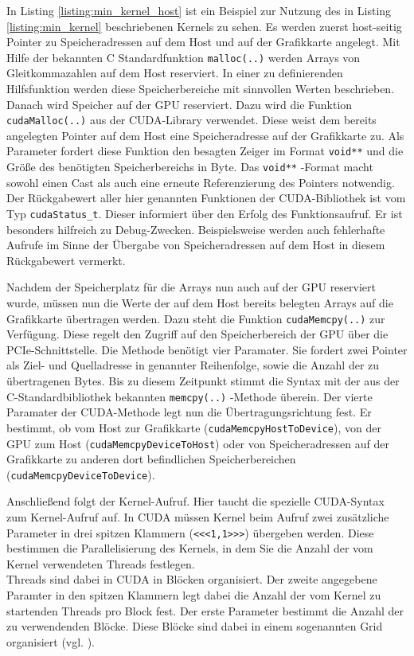 \documentclass[../main.tex]{subfiles}
\begin{document}
In Listing \ref{listing:min_kernel_host} ist ein Beispiel zur Nutzung des in Listing \ref{listing:min_kernel} beschriebenen Kernels zu sehen. Es werden zuerst host-seitig Pointer zu Speicheradressen auf dem Host und auf der Grafikkarte angelegt. Mit Hilfe der bekannten C Standardfunktion \texttt{malloc(..)} werden Arrays von Gleitkommazahlen auf dem Host reserviert. In einer zu definierenden Hilfsfunktion werden diese Speicherbereiche mit sinnvollen Werten beschrieben. Danach wird Speicher auf der GPU reserviert. Dazu wird die Funktion \texttt{cudaMalloc(..)} aus der CUDA-Library verwendet. Diese weist dem bereits angelegten Pointer auf dem Host eine Speicheradresse auf der Grafikkarte zu. Als Parameter fordert diese Funktion den besagten Zeiger im Format \texttt{void**} und die Größe des benötigten Speicherbereichs in Byte. Das \texttt{void**} -Format macht sowohl einen Cast als auch eine erneute Referenzierung des Pointers notwendig. \\ Der Rückgabewert aller hier genannten Funktionen der CUDA-Bibliothek ist vom Typ \texttt{cudaStatus\_t}. Dieser informiert über den Erfolg des Funktionsaufruf. Er ist besonders hilfreich zu Debug-Zwecken. Beispielsweise werden auch fehlerhafte Aufrufe im Sinne der Übergabe von Speicheradressen auf dem Host in diesem Rückgabewert vermerkt. \par Nachdem der Speicherplatz für die Arrays nun auch auf der GPU reserviert wurde, müssen nun die Werte der auf dem Host bereits belegten Arrays auf die Grafikkarte übertragen werden. Dazu steht die Funktion \texttt{cudaMemcpy(..)} zur Verfügung. Diese regelt den Zugriff auf den Speicherbereich der GPU über die PCIe-Schnittstelle. Die Methode benötigt vier Paramater. Sie fordert zwei Pointer als Ziel- und Quelladresse in genannter Reihenfolge, sowie die Anzahl der zu übertragenen Bytes. Bis zu diesem Zeitpunkt stimmt die Syntax mit der aus der C-Standardbibliothek bekannten \texttt{memcpy(..)} -Methode überein. Der vierte Paramater der CUDA-Methode legt nun die Übertragungsrichtung fest. Er bestimmt, ob vom Host zur Grafikkarte (\texttt{cudaMemcpyHostToDevice}), von der GPU zum Host (\texttt{cudaMemcpyDeviceToHost}) oder von Speicheradressen auf der Grafikkarte zu anderen dort befindlichen Speicherbereichen (\texttt{cudaMemcpyDeviceToDevice}). \par Anschließend folgt der Kernel-Aufruf. Hier taucht die spezielle CUDA-Syntax zum Kernel-Aufruf auf. In CUDA müssen Kernel beim Aufruf zwei zusätzliche Parameter in drei spitzen Klammern (\texttt{<<<1,1>>>}) übergeben werden. Diese bestimmen die Parallelisierung des Kernels, in dem Sie die Anzahl der vom Kernel verwendeten Threads festlegen. \\ Threads sind dabei in CUDA in Blöcken organisiert. Der zweite angegebene Paramter in den spitzen Klammern legt dabei die Anzahl der vom Kernel zu startenden Threads pro Block fest. Der erste Parameter bestimmt die Anzahl der zu verwendenden Blöcke. Diese Blöcke sind dabei in einem sogenannten Grid organisiert (vgl. \cite{CUDA_INTRODUCTION}). \par 
\end{document}
